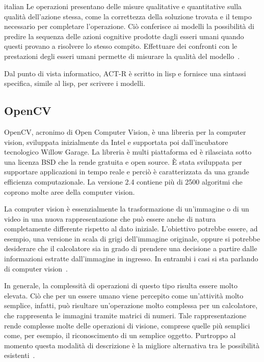\begin{otherlanguage*}{italian}
				Le operazioni presentano delle misure qualitative e quantitative sulla qualità dell'azione stessa, come la correttezza della soluzione trovata e il tempo necessario per completare l'operazione. 
				Ciò conferisce ai modelli la possibilità di predire la sequenza delle azioni cognitive prodotte dagli esseri umani quando questi provano a risolvere lo stesso compito. 
				Effettuare dei confronti con le prestazioni degli esseri umani permette di misurare la qualità del modello~\cite{Sears2012}.

				Dal punto di vista informatico, \mbox{ACT-R} è scritto in lisp e fornisce una sintassi specifica, simile al lisp, per scrivere i modelli.

			\subsection*{OpenCV}
				\mbox{OpenCV}, acronimo di Open Computer Vision, è una libreria per la computer vision, sviluppata inizialmente da Intel e supportata poi dall'incubatore tecnologico Willow Garage.
				La libreria è multi piattaforma ed è rilasciata sotto una licenza BSD che la rende gratuita e open source. 
				È stata sviluppata per supportare applicazioni in tempo reale e perciò è caratterizzata da una grande efficienza computazionale.
				La versione 2.4 contiene più di 2500 algoritmi che coprono molte aree della computer vision.

				La computer vision è essenzialmente la trasformazione di un'immagine o di un video in una nuova rappresentazione che può essere anche di natura completamente differente rispetto al dato iniziale. 
				L'obiettivo potrebbe essere, ad esempio, una versione in scala di grigi dell'immagine originale, oppure si potrebbe desiderare che il calcolatore sia in grado di prendere una decisione a partire dalle informazioni estratte dall'immagine in ingresso.
				In entrambi i casi si sta parlando di computer vision~\cite{bradski2008learning}.
		
				In generale, la complessità di operazioni di questo tipo risulta essere molto elevata. 
				Ciò che per un essere umano viene percepito come un'attività molto semplice, infatti, può risultare un'operazione molto complessa per un calcolatore, che rappresenta le immagini tramite matrici di numeri. 
				Tale rappresentazione rende complesse molte delle operazioni di visione, comprese quelle più semplici come, per esempio, il riconoscimento di un semplice oggetto.
				Purtroppo al momento questa modalità di descrizione è la migliore alternativa tra le possibilità esistenti~\cite{bradski2008learning}.


\end{otherlanguage*}
